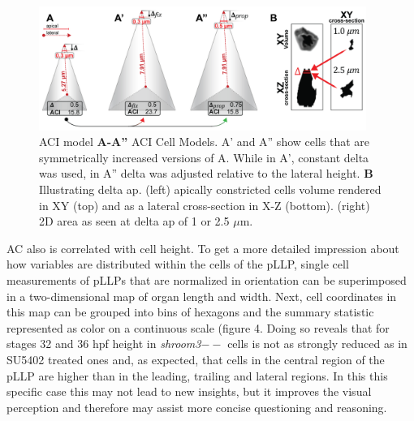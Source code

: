\documentclass[11pt,singlespacinge,twoside]{reedthesis} %
\begin{document}
\begin{figure}

{\centering \includegraphics[width=0.95\textwidth]{figures/summary/aci_fig-01} 

}

\caption[ACI model]{ACI model \textbf{A-A''} ACI Cell Models. A' and A'' show cells that are symmetrically increased versions of A. While in A', constant delta was used, in A'' delta was adjusted relative to the lateral height. \textbf{B} Illustrating delta ap. (left) apically constricted cells volume rendered in XY (top) and as a lateral cross-section in X-Z (bottom). (right) 2D area as seen at delta ap of 1 or 2.5 \(\mu\)m.}\label{fig:disaci}
\end{figure}
AC also is correlated with cell height. To get a more detailed impression about how variables are distributed within the cells of the pLLP, single cell measurements of pLLPs that are normalized in orientation can be superimposed in a two-dimensional map of organ length and width. Next, cell coordinates in this map can be grouped into bins of hexagons and the summary statistic represented as color on a continuous scale (figure 4. Doing so reveals that for stages 32 and 36 hpf height in \emph{shroom3}\(--\) cells is not as strongly reduced as in SU5402 treated ones and, as expected, that cells in the central region of the pLLP are higher than in the leading, trailing and lateral regions. In this this specific case this may not lead to new insights, but it improves the visual perception and therefore may assist more concise questioning and reasoning.
\end{document}
